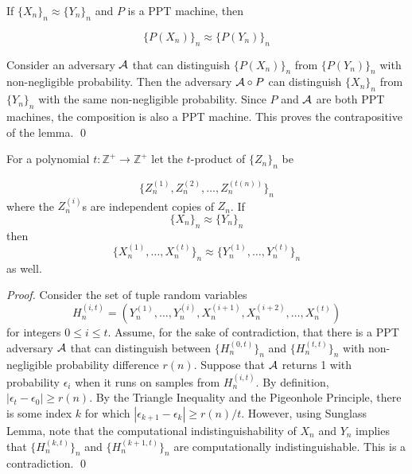 \documentclass[12pt]{tufte-book}
\begin{document}
\begin{lemma}
If $\{X_n\}_n\approx\{Y_n\}_n$ and $P$ is a PPT machine, then

$$\{P(X_n)\}_n\approx \{P(Y_n)\}_n$$
\end{lemma}

\proof
Consider an adversary $\mathcal{A}$ that can distinguish $\{P(X_n)\}_n$ from $\{P(Y_n)\}_n$ with non-negligible probability. Then the adversary $\mathcal{A}\circ P$ can distinguish $\{X_n\}_n$ from $\{Y_n\}_n$ with the same non-negligible probability. Since $P$ and $\mathcal{A}$ are both PPT machines, the composition is also a PPT machine. This proves the contrapositive of the lemma.
\qed


\begin{lemma}
For a polynomial $t:\mathbb{Z}^+\rightarrow\mathbb{Z}^+$ let the $t$-product of $\{Z_n\}_n$ be

$$\{Z_n^{(1)}, Z_n^{(2)},\hdots, Z_n^{(t(n))}\}_n$$
where the $Z_n^{(i)}$s are independent copies of $Z_n$. If
$$\{X_n\}_n\approx\{Y_n\}_n$$
then
$$\{X_n^{(1)},\hdots,X_n^{(t)}\}_n\approx\{Y_n^{(1)},\hdots,Y_n^{(t)}\}_n$$
as well.
\end{lemma}

\begin{proof}
Consider the set of tuple random variables
$$H^{(i,t)}_n = (Y_n^{(1)},\hdots,Y_n^{(i)},X_n^{(i+1)},X_n^{(i+2)},\hdots,X_n^{(t)})$$
for integers $0\le i\le t$. Assume, for the sake of contradiction, that there is a PPT adversary $\mathcal{A}$ that can distinguish between $\{H^{(0,t)}_n\}_n$ and $\{H^{(t,t)}_n\}_n$ with non-negligible probability difference $r(n)$. Suppose that $\mathcal{A}$ returns 1 with probability $\epsilon_i$ when it runs on samples from $H^{(i,t)}_n$. By definition, $|\epsilon_t - \epsilon_0|\ge r(n)$. By the Triangle Inequality and the Pigeonhole Principle, there is some index $k$ for which
$|\epsilon_{k+1} - \epsilon_k|\ge r(n)/t$. However, using Sunglass Lemma, note that the computational indistinguishability of $X_n$ and $Y_n$ implies that $\{H^{(k,t)}_n\}_n$ and $\{H^{(k+1,t)}_n\}_n$ are computationally indistinguishable. This is a contradiction. 
\qed
\end{proof}


\iffalse
\end{document}
